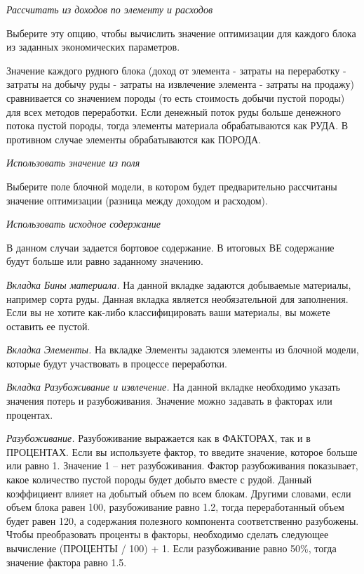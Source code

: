 \begin{multicols}{2}
\emph{Рассчитать из доходов по элементу и расходов}

Выберите эту опцию, чтобы вычислить значение оптимизации для каждого
блока из заданных экономических параметров.

Значение каждого рудного блока (доход от элемента - затраты на
переработку - затраты на добычу руды - затраты на извлечение элемента -
затраты на продажу) сравнивается со значением породы (то есть стоимость
добычи пустой породы) для всех методов переработки. Если денежный поток
руды больше денежного потока пустой породы, тогда элементы материала
обрабатываются как РУДА. В противном случае элементы обрабатываются как
ПОРОДА.

\emph{Использовать значение из поля}

Выберите поле блочной модели, в котором будет предварительно рассчитаны
значение оптимизации (разница между доходом и расходом).

\emph{Использовать исходное содержание}

В данном случаи задается бортовое содержание. В итоговых ВЕ содержание
будут больше или равно заданному значению.

\emph{Вкладка Бины материала.} На данной вкладке задаются добываемые
материалы, например сорта руды. Данная вкладка является необязательной
для заполнения. Если вы не хотите как-либо классифицировать ваши
материалы, вы можете оставить ее пустой.

\emph{Вкладка Элементы.} На вкладке Элементы задаются элементы из
блочной модели, которые будут участвовать в процессе переработки.

\emph{Вкладка Разубоживание и извлечение.} На данной вкладке необходимо
указать значения потерь и разубоживания. Значение можно задавать в
факторах или процентах.

\emph{Разубоживание.} Разубоживание выражается как в ФАКТОРАХ, так и в
ПРОЦЕНТАХ. Если вы используете фактор, то введите значение, которое
больше или равно 1. Значение 1 -- нет разубоживания. Фактор
разубоживания показывает, какое количество пустой породы будет добыто
вместе с рудой. Данный коэффициент влияет на добытый объем по всем
блокам. Другими словами, если объем блока равен 100, разубоживание равно
1.2, тогда переработанный объем будет равен 120, а содержания полезного
компонента соответственно разубожены. Чтобы преобразовать проценты в
факторы, необходимо сделать следующее вычисление (ПРОЦЕНТЫ / 100) + 1.
Если разубоживание равно 50\%, тогда значение фактора равно 1.5.


\end{multicols}
